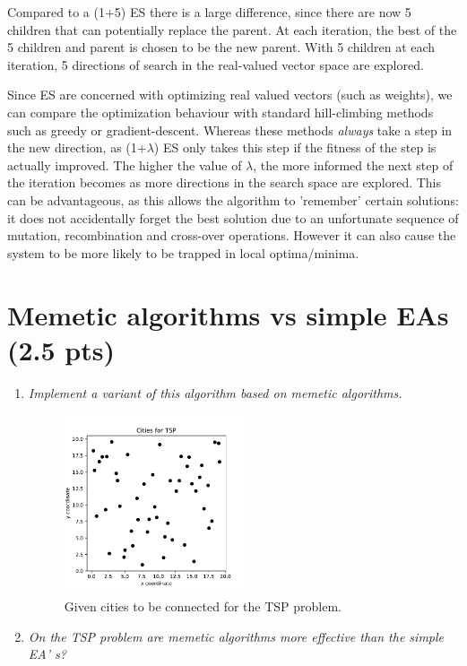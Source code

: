 \documentclass{article}
\begin{document}
Compared to a (1+5) ES there is a large difference, since there are now 5 children that can potentially replace the parent. At each iteration, the best of the 5 children and parent is chosen to be the new parent. With 5 children at each iteration, 5 directions of search in the real-valued vector space are explored.

Since ES are concerned with optimizing real valued vectors (such as weights), we can compare the optimization behaviour with standard hill-climbing methods such as greedy or gradient-descent. Whereas these methods \textit{always} take a step in the new direction, as (1+$\lambda$) ES only takes this step if the fitness of the step is actually improved. The higher the value of $\lambda$, the more informed the next step of the iteration becomes as more directions in the search space are explored. This can be advantageous, as this allows the algorithm to 'remember' certain solutions: it does not accidentally forget the best solution due to an unfortunate sequence of mutation, recombination and cross-over operations. However it can also cause the system to be more likely to be trapped in local optima/minima. 


\section{Memetic algorithms vs simple EAs (2.5 pts)}
\begin{enumerate}[label=\alph*)]
    \item \textit{Implement a variant of this algorithm based on memetic algorithms.} \\
    
    \begin{figure}[H]
        \centering
        \includegraphics[width=0.5\textwidth]{Assignment 1/Figures/A1_6a.pdf}
        \caption{Given cities to be connected for the TSP problem.}
        \label{fig:A1_6a}
    \end{figure}

    \item \textit{On the TSP problem are memetic algorithms more effective than the simple EA’ s? } \\
\end{enumerate}
\end{document}
